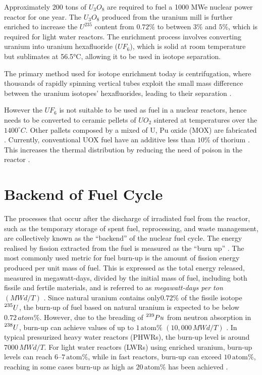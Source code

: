 Approximately 200 tons of \(U_3O_8\) are required to fuel a 1000 MWe nuclear power reactor for one year. The \(U_3O_8\) produced from the uranium mill is further enriched to increase the \(U^{235}\) content from \(0.72\%\) to between \(3\%\) and \(5\%\), which is required for light water reactors. The enrichment process involves converting uranium into uranium hexafluoride (\(UF_6\)), which is solid at room temperature but sublimates at 56.5°C, allowing it to be used in isotope separation.

The primary method used for isotope enrichment today is centrifugation, where thousands of rapidly spinning vertical tubes exploit the small mass difference between the uranium isotopes' hexafluorides, leading to their separation \cite{fuel_cycle_book}.

However the \(UF_6\) is not suitable to be used as fuel in a nuclear reactors, hence needs to be converted to ceramic pellets of \(UO_2\) sintered at temperatures over the \(1400^{\circ}C\). Other pallets composed by a mixed of U, Pu oxide (MOX) are fabricated \cite{fuel_cycle_book}. Currently, conventional UOX fuel have an additive less than \(10\%\) of thorium . This increases the thermal distribution by reducing the need of poison in the reactor \cite{Th_cycle_viability}.

\section{Backend of Fuel Cycle}

The processes that occur after the discharge of irradiated fuel from the reactor, such as the temporary storage of spent fuel, reprocessing, and waste management, are collectively known as the ``backend'' of the nuclear fuel cycle. The energy realised by fission extracted from the fuel is measured as the ``burn up'' \cite{fuel_cycle_book}. The most commonly used metric for fuel burn-up is the amount of fission energy produced per unit mass of fuel. This is expressed as the total energy released, measured in megawatt-days, divided by the initial mass of fuel, including both fissile and fertile materials, and is referred to as \textit{megawatt-days per ton} \((MWd/T)\) \cite{nuclear_reactors_adv}. Since natural uranium contains only\( 0.72\%\) of the fissile isotope \(\prescript{235}{}{U}\), the burn-up of fuel based on natural uranium is expected to be below \(0.72 \, atom\%\). However, due to the breading of \(\prescript{239}{}{Pu}\) from neutron absorption in \(\prescript{238}{}{U}\), burn-up can achieve values of up to \(1 \, \text{atom} \%\) \((10,000 \, MWd/T)\) \cite{fuel_cycle_book}. In typical pressurized heavy water reactors (PHWRs), the burn-up level is around \(7000 \, MWd/T\). For light water reactors (LWRs) using enriched uranium, burn-up levels can reach \(6–7 \, \text{atom} \%\), while in fast reactors, burn-up can exceed \(10 \, \text{atom} \%\), reaching in some cases burn-up as high as \(20 \, \text{atom} \%\) has been achieved \cite{fuel_cycle_book}.


